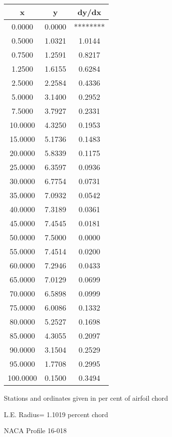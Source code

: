 \documentclass[11pt]{book}
\begin{document}
 \vspace{8mm}
 \begin{tabular}{|c|c|c|} \hline 
  x  &  y  &  dy/dx \\
 \hline
0.0000 & 0.0000 & ******** \\
0.5000 & 1.0321 & 1.0144 \\
0.7500 & 1.2591 & 0.8217 \\
1.2500 & 1.6155 & 0.6284 \\
2.5000 & 2.2584 & 0.4336 \\
5.0000 & 3.1400 & 0.2952 \\
7.5000 & 3.7927 & 0.2331 \\
10.0000 & 4.3250 & 0.1953 \\
15.0000 & 5.1736 & 0.1483 \\
20.0000 & 5.8339 & 0.1175 \\
25.0000 & 6.3597 & 0.0936 \\
30.0000 & 6.7754 & 0.0731 \\
35.0000 & 7.0932 & 0.0542 \\
40.0000 & 7.3189 & 0.0361 \\
45.0000 & 7.4545 & 0.0181 \\
50.0000 & 7.5000 & 0.0000 \\
55.0000 & 7.4514 & 0.0200 \\
60.0000 & 7.2946 & 0.0433 \\
65.0000 & 7.0129 & 0.0699 \\
70.0000 & 6.5898 & 0.0999 \\
75.0000 & 6.0086 & 0.1332 \\
80.0000 & 5.2527 & 0.1698 \\
85.0000 & 4.3055 & 0.2097 \\
90.0000 & 3.1504 & 0.2529 \\
95.0000 & 1.7708 & 0.2995 \\
100.0000 & 0.1500 & 0.3494 \\
 \hline
 \end{tabular}
 \vspace{8mm}


Stations and ordinates given in per cent of airfoil chord 


L.E. Radius=  1.1019 percent chord
 \newpage
  \label{p16-018}
 \begin{Large}
 NACA Profile 16-018
 \end{Large}
  
\end{document}
